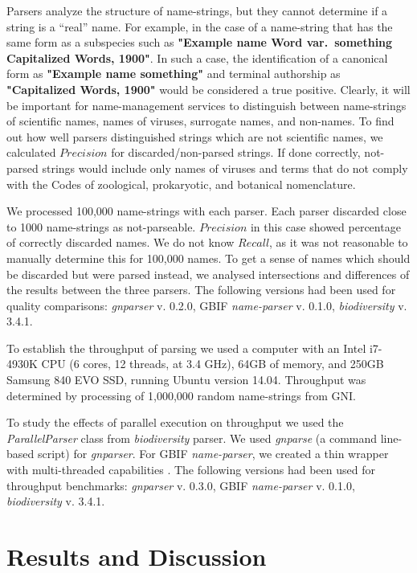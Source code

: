 \documentclass{bmcart}
\begin{document}
Parsers analyze the structure of name-strings, but they cannot determine if a
string is a ``real'' name. For example, in the case of a name-string that has
the same form as a subspecies such as \textbf{"Example name Word var.\
something Capitalized Words, 1900"}. In such a case, the identification of a
canonical form as \textbf{"Example name something"} and terminal authorship as
\textbf{"Capitalized Words, 1900"} would be considered a true positive.
Clearly, it will be important for name-management services to distinguish
between name-strings of scientific names, names of viruses, surrogate names,
and non-names. To find out how well parsers distinguished strings which are not
scientific names, we calculated $Precision$ for discarded/non-parsed strings.
If done correctly, not-parsed strings would include only names of viruses and
terms that do not comply with the Codes of zoological, prokaryotic, and
botanical nomenclature.

We processed 100,000 name-strings with each parser.  Each parser discarded
close to 1000 name-strings as not-parseable.  $Precision$ in this case showed
percentage of correctly discarded names.  We do not know $Recall$, as it was
not reasonable to manually determine this for 100,000 names. To get a sense of
names which should be discarded but were parsed instead, we analysed
intersections and differences of the results between the three parsers.  The
following versions had been used for quality comparisons: \textit{gnparser} v.
0.2.0, GBIF \textit{name-parser} v. 0.1.0, \textit{biodiversity} v. 3.4.1.

To establish the throughput of parsing we used a computer with an Intel
i7-4930K CPU (6 cores, 12 threads, at 3.4 GHz), 64GB of memory, and 250GB
Samsung 840 EVO SSD, running Ubuntu version 14.04. Throughput was determined by
processing of 1,000,000 random name-strings from GNI.

To study the effects of parallel execution on throughput we used the
\textit{ParallelParser} class from \textit{biodiversity} parser. We used
\textit{gnparse} (a command line-based script) for \textit{gnparser}.  For GBIF
\textit{name-parser}, we created a thin wrapper with multi-threaded
capabilities \cite{gbifparser}. The following versions had been used for
throughput benchmarks: \textit{gnparser} v. 0.3.0, GBIF \textit{name-parser} v.
0.1.0, \textit{biodiversity} v. 3.4.1.

\section*{Results and Discussion}\label{sec:discussion}
\end{document}
